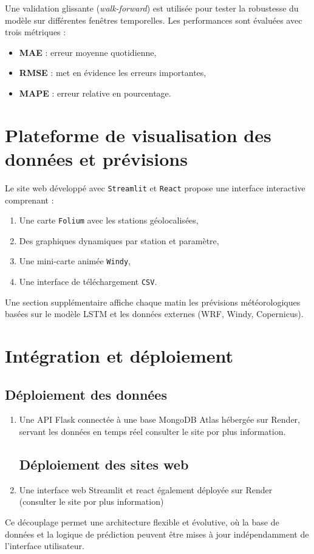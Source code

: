 \documentclass[a4paper,12pt,openany]{report}
\begin{document}
\quad Une validation glissante (\textit{walk-forward}) est utilisée pour tester la robustesse du modèle sur différentes fenêtres temporelles. Les performances sont évaluées avec trois métriques :

\begin{itemize}
	\item \textbf{MAE} : erreur moyenne quotidienne,
	\item \textbf{RMSE} : met en évidence les erreurs importantes,
	\item \textbf{MAPE} : erreur relative en pourcentage.
\end{itemize}
\section{Plateforme de visualisation des données et prévisions}

\quad Le site web développé avec \texttt{Streamlit} et \texttt{React} propose une interface interactive comprenant :
\begin{enumerate}
	\item Une carte \texttt{Folium} avec les stations géolocalisées,
	\item Des graphiques dynamiques par station et paramètre,
	\item Une mini-carte animée \texttt{Windy},
	\item Une interface de téléchargement \texttt{CSV}.
\end{enumerate}

\quad Une section supplémentaire affiche chaque matin les prévisions météorologiques basées sur le modèle LSTM et les données externes (WRF, Windy, Copernicus).

\section{Intégration et déploiement}

\subsection{Déploiement des données }
\begin{enumerate}
	\item Une API Flask connectée à une base MongoDB Atlas hébergée sur Render, servant les données en temps réel consulter le site por plus information. \\
	
	
	
	\subsection{Déploiement des sites web }
	\item Une interface web Streamlit et react  également déployée sur Render (consulter le site por plus information)	
\end{enumerate}
Ce découplage permet une architecture flexible et évolutive, où la base de données et la logique de prédiction peuvent être mises à jour indépendamment de l’interface utilisateur.
\end{document}
